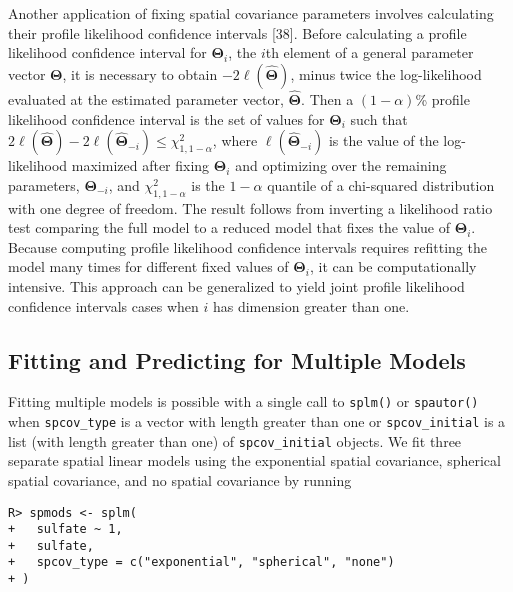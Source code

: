 \documentclass[10pt,letterpaper]{article}
\begin{document}
Another application of fixing spatial covariance parameters involves
calculating their profile likelihood confidence intervals {[}38{]}.
Before calculating a profile likelihood confidence interval for
\(\boldsymbol{\Theta}_i\), the \(i\)th element of a general parameter
vector \(\boldsymbol{\Theta}\), it is necessary to obtain
\(-2\ell(\hat{\boldsymbol{\Theta}})\), minus twice the log-likelihood
evaluated at the estimated parameter vector,
\(\hat{\boldsymbol{\Theta}}\). Then a \((1 - \alpha)\)\% profile
likelihood confidence interval is the set of values for
\(\boldsymbol{\Theta}_i\) such that
\(2\ell(\hat{\boldsymbol{\Theta}}) - 2\ell(\hat{\boldsymbol{\Theta}}_{-i}) \leq \chi^2_{1, 1 - \alpha}\),
where \(\ell(\hat{\boldsymbol{\Theta}}_{-i})\) is the value of the
log-likelihood maximized after fixing \(\boldsymbol{\Theta}_i\) and
optimizing over the remaining parameters, \(\boldsymbol{\Theta}_{-i}\),
and \(\chi^2_{1, 1 - \alpha}\) is the \(1 - \alpha\) quantile of a
chi-squared distribution with one degree of freedom. The result follows
from inverting a likelihood ratio test comparing the full model to a
reduced model that fixes the value of \(\boldsymbol{\Theta}_i\). Because
computing profile likelihood confidence intervals requires refitting the
model many times for different fixed values of
\(\boldsymbol{\Theta}_i\), it can be computationally intensive. This
approach can be generalized to yield joint profile likelihood confidence
intervals cases when \(i\) has dimension greater than one.

\hypertarget{fitting-and-predicting-for-multiple-models}{%
\subsection{Fitting and Predicting for Multiple
Models}\label{fitting-and-predicting-for-multiple-models}}

Fitting multiple models is possible with a single call to
\texttt{splm()} or \texttt{spautor()} when \texttt{spcov\_type} is a
vector with length greater than one or \texttt{spcov\_initial} is a list
(with length greater than one) of \texttt{spcov\_initial} objects. We
fit three separate spatial linear models using the exponential spatial
covariance, spherical spatial covariance, and no spatial covariance by
running

\begin{verbatim}
R> spmods <- splm(
+   sulfate ~ 1,
+   sulfate,
+   spcov_type = c("exponential", "spherical", "none")
+ )
\end{verbatim}
\end{document}
